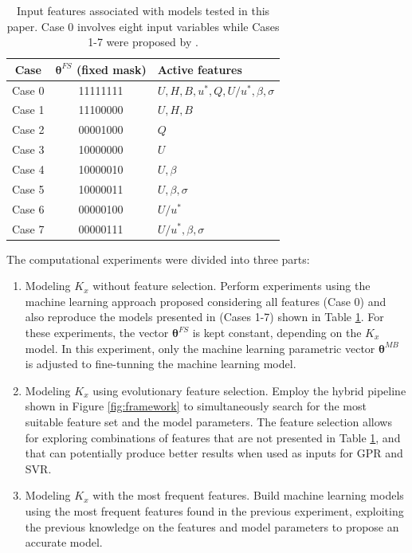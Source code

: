 \documentclass[a4paper,12pt, english]{article}
\newcommand{\xp}{\bm{\theta}}
\newcommand{\xfs}{\xp^{FS}}
\newcommand{\xmb}{\xp^{MB}}
\begin{document}
\begin{table}[!htb]
    \centering
    \caption{ \label{tab:cases-features} Input features associated with models tested in this paper.
    Case 0 involves eight input variables while Cases 1-7 were proposed by \cite{tayfur2005predicting}.
    }
    \begin{tabular}{ccl}
    \hline
      Case   & $\xfs$ (fixed mask) & Active features                         \\ \hline
      Case 0 &  11111111   & $U , H , B, u^*, Q, U/u^*, \beta,\sigma$\\ 
      Case 1 &  11100000   & $U , H , B                             $\\
      Case 2 &  00001000   & $Q                                     $\\
      Case 3 &  10000000   & $U                                     $\\
      Case 4 &  10000010   & $U, \beta                              $\\
      Case 5 &  10000011   & $U, \beta, \sigma                      $\\
      Case 6 &  00000100   & $U/u^*                                 $\\
      Case 7 &  00000111   & $U/u^*, \beta, \sigma                  $\\ \hline
    \end{tabular}
\end{table}


The computational experiments were divided into three parts:
\begin{enumerate}

\item Modeling $K_x$ without feature selection. 
 Perform experiments using the machine learning approach proposed considering all features (Case 0) and also reproduce the models presented in \cite{tayfur2005predicting} (Cases 1-7) shown in Table \ref{tab:cases-features}. 
 For these experiments, the vector $\xfs$ is kept constant, depending on the $K_x$ model. 
 In this experiment, only the machine learning parametric vector $\xmb$ is adjusted to fine-tunning the machine learning model.
 
 \item Modeling $K_x$ using evolutionary feature selection. 
 Employ the hybrid pipeline shown in Figure \ref{fig:framework} to simultaneously search for the most suitable feature set and the model parameters. The feature selection allows for exploring combinations of features that are not presented in Table \ref{tab:cases-features}, and that can potentially produce better results when used as inputs for GPR and SVR. 
 
 \item Modeling $K_x$ with the most frequent features. 
 Build machine learning models using the most frequent features found in the previous experiment, exploiting the previous knowledge on the features and model parameters to propose an accurate model.
 
\end{enumerate}
\end{document}
